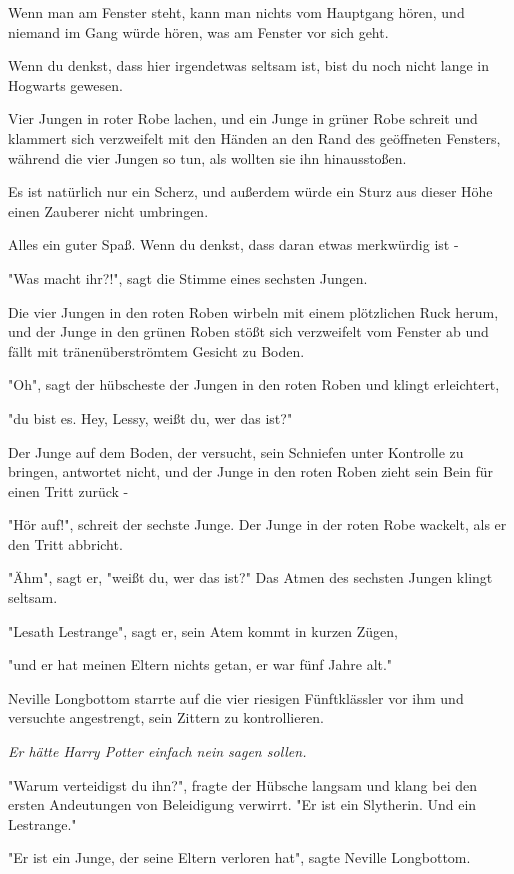 {Wenn man am Fenster steht, kann man nichts vom Hauptgang hören, und niemand im Gang würde hören, was am Fenster vor sich geht.

Wenn du denkst, dass hier irgendetwas seltsam ist, bist du noch nicht lange in Hogwarts gewesen.

Vier Jungen in roter Robe lachen, und ein Junge in grüner Robe schreit und klammert sich verzweifelt mit den Händen an den Rand des geöffneten Fensters, während die vier Jungen so tun, als wollten sie ihn hinausstoßen.

Es ist natürlich nur ein Scherz, und außerdem würde ein Sturz aus dieser Höhe einen Zauberer nicht umbringen.

Alles ein guter Spaß. Wenn du denkst, dass daran etwas merkwürdig ist -

"Was macht ihr?!", sagt die Stimme eines sechsten Jungen.

Die vier Jungen in den roten Roben wirbeln mit einem plötzlichen Ruck herum, und der Junge in den grünen Roben stößt sich verzweifelt vom Fenster ab und fällt mit tränenüberströmtem Gesicht zu Boden.

"Oh", sagt der hübscheste der Jungen in den roten Roben und klingt erleichtert,

"du bist es. Hey, Lessy, weißt du, wer das ist?"

Der Junge auf dem Boden, der versucht, sein Schniefen unter Kontrolle zu bringen, antwortet nicht, und der Junge in den roten Roben zieht sein Bein für einen Tritt zurück -

"Hör auf!", schreit der sechste Junge. Der Junge in der roten Robe wackelt, als er den Tritt abbricht.

"Ähm", sagt er, "weißt du, wer das ist?" Das Atmen des sechsten Jungen klingt seltsam.

"Lesath Lestrange", sagt er, sein Atem kommt in kurzen Zügen,

"und er hat meinen Eltern nichts getan, er war fünf Jahre alt."

Neville Longbottom starrte auf die vier riesigen Fünftklässler vor ihm und versuchte angestrengt, sein Zittern zu kontrollieren.

\emph{Er hätte Harry Potter einfach nein sagen sollen.}

"Warum verteidigst du ihn?", fragte der Hübsche langsam und klang bei den ersten Andeutungen von Beleidigung verwirrt. "Er ist ein Slytherin. Und ein Lestrange."

"Er ist ein Junge, der seine Eltern verloren hat", sagte Neville Longbottom.

}
